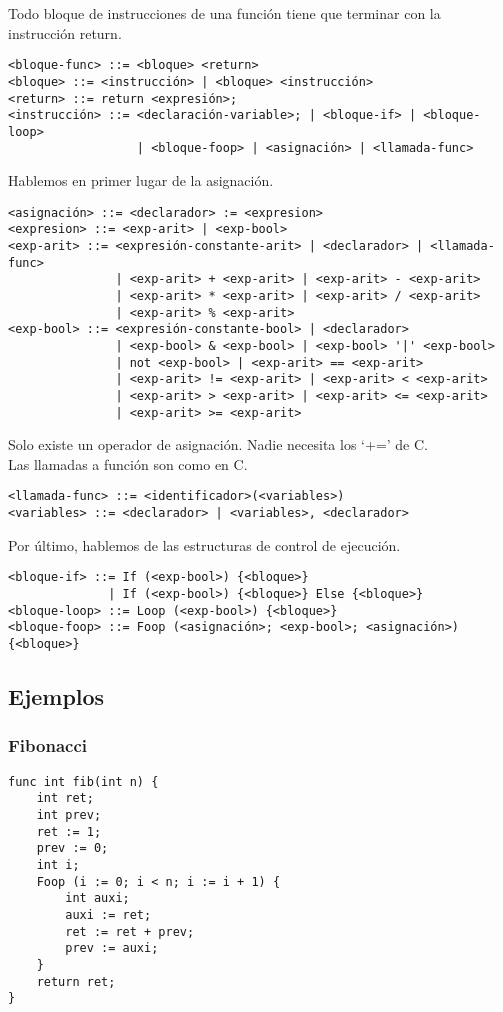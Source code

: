 \documentclass[spanish, a4paper, 12pt] {article}
\begin{document}
Todo bloque de instrucciones de una función tiene que terminar con la instrucción return.
\begin{verbatim}
<bloque-func> ::= <bloque> <return>
<bloque> ::= <instrucción> | <bloque> <instrucción>
<return> ::= return <expresión>;
<instrucción> ::= <declaración-variable>; | <bloque-if> | <bloque-loop>
                  | <bloque-foop> | <asignación> | <llamada-func>
\end{verbatim}
Hablemos en primer lugar de la asignación.
\begin{verbatim}
<asignación> ::= <declarador> := <expresion>
<expresion> ::= <exp-arit> | <exp-bool>
<exp-arit> ::= <expresión-constante-arit> | <declarador> | <llamada-func>
               | <exp-arit> + <exp-arit> | <exp-arit> - <exp-arit>
               | <exp-arit> * <exp-arit> | <exp-arit> / <exp-arit>
               | <exp-arit> % <exp-arit>
<exp-bool> ::= <expresión-constante-bool> | <declarador>
               | <exp-bool> & <exp-bool> | <exp-bool> '|' <exp-bool>
               | not <exp-bool> | <exp-arit> == <exp-arit>
               | <exp-arit> != <exp-arit> | <exp-arit> < <exp-arit>
               | <exp-arit> > <exp-arit> | <exp-arit> <= <exp-arit>
               | <exp-arit> >= <exp-arit>
\end{verbatim}
Solo existe un operador de asignación. Nadie necesita los `+=' de C.\\

Las llamadas a función son como en C.
\begin{verbatim}
<llamada-func> ::= <identificador>(<variables>)
<variables> ::= <declarador> | <variables>, <declarador>
\end{verbatim}
Por último, hablemos de las estructuras de control de ejecución.
\begin{verbatim}
<bloque-if> ::= If (<exp-bool>) {<bloque>}
              | If (<exp-bool>) {<bloque>} Else {<bloque>}
<bloque-loop> ::= Loop (<exp-bool>) {<bloque>}
<bloque-foop> ::= Foop (<asignación>; <exp-bool>; <asignación>) {<bloque>}
\end{verbatim}
\subsection*{Ejemplos}
\subsubsection*{Fibonacci}
\begin{verbatim}
func int fib(int n) {
    int ret;
    int prev;
    ret := 1;
    prev := 0;
    int i;
    Foop (i := 0; i < n; i := i + 1) {
        int auxi;
        auxi := ret;
        ret := ret + prev;
        prev := auxi;
    }
    return ret;
}
\end{verbatim}
\end{document}
